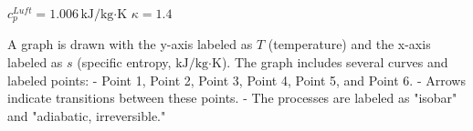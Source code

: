 \( c_{p}^{Luft} = 1.006 \, \text{kJ/kg·K} \)  
\( \kappa = 1.4 \)  

A graph is drawn with the y-axis labeled as \( T \) (temperature) and the x-axis labeled as \( s \) (specific entropy, \( \text{kJ/kg·K} \)).  
The graph includes several curves and labeled points:  
- Point 1, Point 2, Point 3, Point 4, Point 5, and Point 6.  
- Arrows indicate transitions between these points.  
- The processes are labeled as "isobar" and "adiabatic, irreversible."